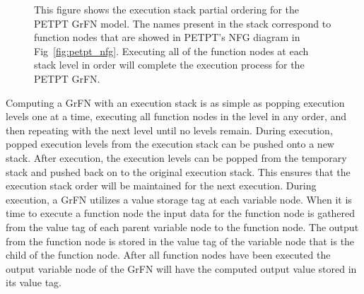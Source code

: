 \begin{figure}[!htbp]
  \label{fig:petpt_execution_stack}
  \centering
  \caption[PETPT GrFN Execution Stack]{This figure shows the execution stack partial ordering for the PETPT GrFN model. The names present in the stack correspond to function nodes that are showed in PETPT's NFG diagram in Fig~\ref{fig:petpt_nfg}. Executing all of the function nodes at each stack level in order will complete the execution process for the PETPT GrFN.}
\end{figure}

Computing a GrFN with an execution stack is as simple as popping execution levels one at a time, executing all function nodes in the level in any order, and then repeating with the next level until no levels remain.
During execution, popped execution levels from the execution stack can be pushed onto a new stack.
After execution, the execution levels can be popped from the temporary stack and pushed back on to the original execution stack.
This ensures that the execution stack order will be maintained for the next execution.
During execution, a GrFN utilizes a value storage tag at each variable node.
When it is time to execute a function node the input data for the function node is gathered from the value tag of each parent variable node to the function node.
The output from the function node is stored in the value tag of the variable node that is the child of the function node.
After all function nodes have been executed the output variable node of the GrFN will have the computed output value stored in its value tag.

